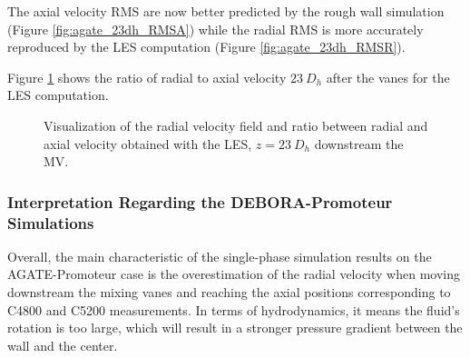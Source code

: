 \npar

The axial velocity RMS are now better predicted by the rough wall simulation (Figure \ref{fig:agate_23dh_RMSA}) while the radial RMS is more accurately reproduced by the LES computation (Figure \ref{fig:agate_23dh_RMSR}). 


\npar

Figure \ref{fig:ur_s_ua_44dh} shows the ratio of radial to axial velocity $23~D_{h}$ after the vanes for the LES computation.

\begin{figure}
\caption{Visualization of the radial velocity field and ratio between radial and axial velocity obtained with the LES, $z=23~D_{h}$ downstream the MV.}
\label{fig:ur_s_ua_44dh}
\end{figure}



\clearpage



\subsubsection{Interpretation Regarding the DEBORA-Promoteur Simulations}

Overall, the main characteristic of the single-phase simulation results on the AGATE-Promoteur case is the overestimation of the radial velocity when moving downstream the mixing vanes and reaching the axial positions corresponding to C4800 and C5200 measurements. In terms of hydrodynamics, it means the fluid's rotation is too large, which will result in a stronger pressure gradient between the wall and the center. 

